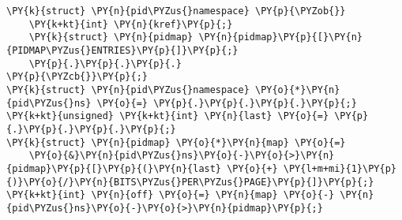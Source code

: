 \begin{Verbatim}[commandchars=\\\{\},codes={\catcode`\$=3\catcode`\^=7\catcode`\_=8}]
\PY{k}{struct} \PY{n}{pid\PYZus{}namespace} \PY{p}{\PYZob{}}
    \PY{k+kt}{int} \PY{n}{kref}\PY{p}{;}
    \PY{k}{struct} \PY{n}{pidmap} \PY{n}{pidmap}\PY{p}{[}\PY{n}{PIDMAP\PYZus{}ENTRIES}\PY{p}{]}\PY{p}{;}
    \PY{p}{.}\PY{p}{.}\PY{p}{.}
\PY{p}{\PYZcb{}}\PY{p}{;}
\PY{k}{struct} \PY{n}{pid\PYZus{}namespace} \PY{o}{*}\PY{n}{pid\PYZus{}ns} \PY{o}{=} \PY{p}{.}\PY{p}{.}\PY{p}{.}\PY{p}{;}
\PY{k+kt}{unsigned} \PY{k+kt}{int} \PY{n}{last} \PY{o}{=} \PY{p}{.}\PY{p}{.}\PY{p}{.}\PY{p}{;}
\PY{k}{struct} \PY{n}{pidmap} \PY{o}{*}\PY{n}{map} \PY{o}{=}
    \PY{o}{&}\PY{n}{pid\PYZus{}ns}\PY{o}{-}\PY{o}{>}\PY{n}{pidmap}\PY{p}{[}\PY{p}{(}\PY{n}{last} \PY{o}{+} \PY{l+m+mi}{1}\PY{p}{)}\PY{o}{/}\PY{n}{BITS\PYZus{}PER\PYZus{}PAGE}\PY{p}{]}\PY{p}{;}
\PY{k+kt}{int} \PY{n}{off} \PY{o}{=} \PY{n}{map} \PY{o}{-} \PY{n}{pid\PYZus{}ns}\PY{o}{-}\PY{o}{>}\PY{n}{pidmap}\PY{p}{;}
\end{Verbatim}
